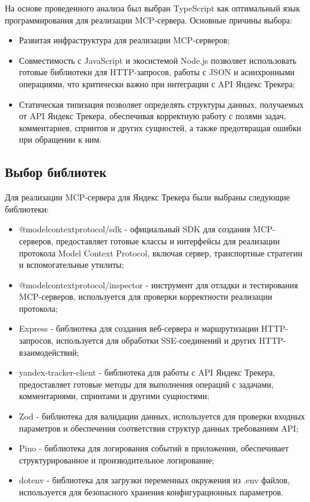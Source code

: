 \documentclass[utf8, russian]{eskdtext}
\begin{document}
На основе проведенного анализа был выбран TypeScript как оптимальный язык программирования для реализации MCP-сервера. Основные причины выбора:
\begin{itemize}
    \item Развитая инфраструктура для реализации MCP-серверов;
    \item Совместимость с JavaScript и экосистемой Node.js позволяет использовать готовые библиотеки для HTTP-запросов, работы с JSON и асинхронными операциями, что критически важно при интеграции с API Яндекс Трекера;
    \item Статическая типизация позволяет определять структуры данных, получаемых от API Яндекс Трекера, обеспечивая корректную работу с полями задач, комментариев, спринтов и других сущностей, а также предотвращая ошибки при обращении к ним.
\end{itemize}

\subsection{Выбор библиотек}

    Для реализации MCP-сервера для Яндекс Трекера были выбраны следующие библиотеки:
    \begin{itemize}
        \item {@modelcontextprotocol/sdk} - официальный SDK для создания MCP-серверов, предоставляет готовые классы и интерфейсы для реализации протокола Model Context Protocol, включая сервер, транспортные стратегии и вспомогательные утилиты;
        \item {@modelcontextprotocol/inspector} - инструмент для отладки и тестирования MCP-серверов, используется для проверки корректности реализации протокола;
        \item {Express} - библиотека для создания веб-сервера и маршрутизации HTTP-запросов, используется для обработки SSE-соединений и других HTTP-взаимодействий;
        \item {yandex-tracker-client} - библиотека для работы с API Яндекс Трекера, предоставляет готовые методы для выполнения операций с задачами, комментариями, спринтами и другими сущностями;
        \item {Zod} - библиотека для валидации данных, используется для проверки входных параметров и обеспечения соответствия структур данных требованиям API;
        \item {Pino} - библиотека для логирования событий в приложении, обеспечивает структурированное и производительное логирование;
        \item {dotenv} - библиотека для загрузки переменных окружения из .env файлов, используется для безопасного хранения конфигурационных параметров.
    \end{itemize}
\end{document}
